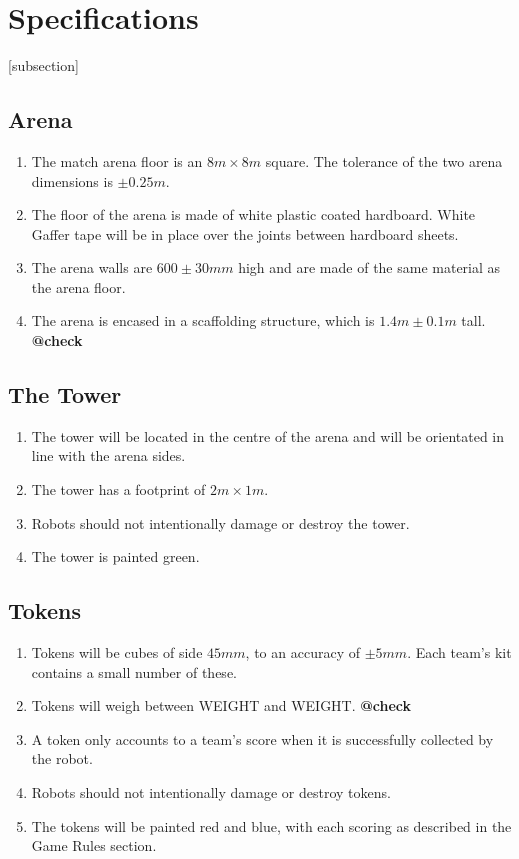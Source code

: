 \section{Specifications}
[subsection]
\newcommand{\rcnii}{\stepcounter{rulei}\arabic{section}.\arabic{subsection}.\arabic{rulei}}
\renewcommand{\labelenumi}{\rcnii}

\subsection{Arena}
\begin{enumerate}
\item The match arena floor is an $8m \times 8m$ square.
 The tolerance of the two arena dimensions is $\pm0.25m$.
\item The floor of the arena is made of white plastic coated hardboard.
 White Gaffer tape will be in place over the joints between hardboard sheets.
\item The arena walls are $600\pm30mm$ high and are made of the same material as the arena floor.
\item The arena is encased in a scaffolding structure, which is $1.4m \pm0.1m$ tall.	\textbf{@check}
\end{enumerate}

\subsection{The Tower}
\label{tower}
\begin {enumerate} 
\item The tower will be located in the centre of the arena and will be orientated in line with the arena sides.
\item The tower has a footprint of $2m \times 1m$.
\item Robots should not intentionally damage or destroy the tower.
\item The tower is painted green.
\end {enumerate}

\subsection{Tokens}
\label{tokens}
\begin {enumerate} 
\item Tokens will be cubes of side $45mm$, to an accuracy of $\pm5mm$.
 Each team's kit contains a small number of these.
\item Tokens will weigh between WEIGHT and WEIGHT.	\textbf{@check}
\item A token only accounts to a team's score when it is successfully collected by the robot.
\item Robots should not intentionally damage or destroy tokens.
\item The tokens will be painted red and blue, with each scoring as described in the Game Rules section.
\end {enumerate}

